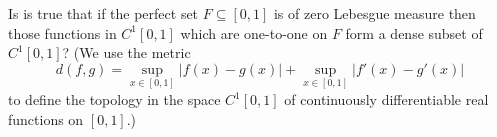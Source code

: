 Is is true that if the perfect set $F\subseteq [0,1]$ is of zero Lebesgue measure then those functions in $C^1[0,1]$ which are one-to-one on $F$ form a dense subset of $C^1[0,1]$?
(We use the metric
$$d(f,g)=\sup_{x\in[0,1]} |f(x)-g(x)| + \sup_{x\in[0,1]} |f'(x)-g'(x)|$$to define the topology in the space $C^1[0,1]$ of continuously differentiable real functions on $[0,1]$.)